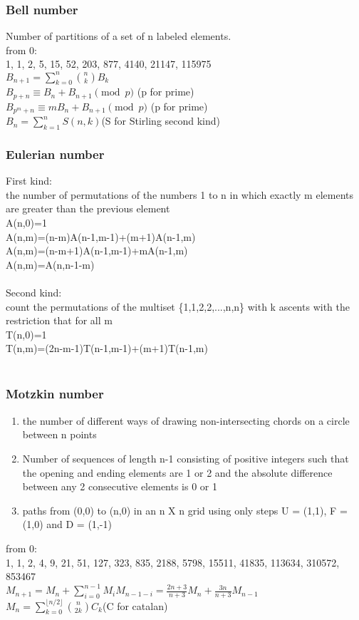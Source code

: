 \subsubsection{Bell number}
Number of partitions of a set of n labeled elements.\\
from 0:\\
1, 1, 2, 5, 15, 52, 203, 877, 4140, 21147, 115975\\
$B_{n+1}=\sum\limits_{k=0}^{n}{{n \choose k}B_k}$\\
$B_{p+n}\equiv B_n+B_{n+1}\pmod p$ (p for prime)\\
$B_{p^m+n}\equiv mB_n+B_{n+1}\pmod p$ (p for prime)\\
$B_n=\sum\limits_{k=1}^{n}S(n,k)$(S for Stirling second kind)\\

\subsubsection{Eulerian number}
First kind:\\
the number of permutations of the numbers 1 to n in which exactly m elements are greater than the previous element\\
A(n,0)=1\\
A(n,m)=(n-m)A(n-1,m-1)+(m+1)A(n-1,m)\\
A(n,m)=(n-m+1)A(n-1,m-1)+mA(n-1,m)\\
A(n,m)=A(n,n-1-m)\\
\\
Second kind:\\
count the permutations of the multiset \{1,1,2,2,...,n,n\} with k ascents with the restriction that for all m\\
T(n,0)=1\\
T(n,m)=(2n-m-1)T(n-1,m-1)+(m+1)T(n-1,m)\\
\\

\subsubsection{Motzkin number}
\begin{enumerate}
\item  the number of different ways of drawing non-intersecting chords on a circle between n points
\item Number of sequences of length n-1 consisting of positive integers such that the opening and ending elements are 1 or 2 and the absolute difference between any 2 consecutive elements is 0 or 1
\item paths from (0,0) to (n,0) in an n X n grid using only steps U = (1,1), F = (1,0) and D = (1,-1)
\end{enumerate}
from 0:\\
1, 1, 2, 4, 9, 21, 51, 127, 323, 835, 2188, 5798, 15511, 41835, 113634, 310572, 853467\\
$M_{n+1}=M_n+\sum\limits_{i=0}^{n-1}M_iM_{n-1-i}=\frac{2n+3}{n+3}M_n+\frac{3n}{n+3}M_{n-1}$\\
$M_n=\sum\limits_{k=0}^{\lfloor n/2\rfloor}\binom{n}{2k}C_k$(C for catalan)\\

